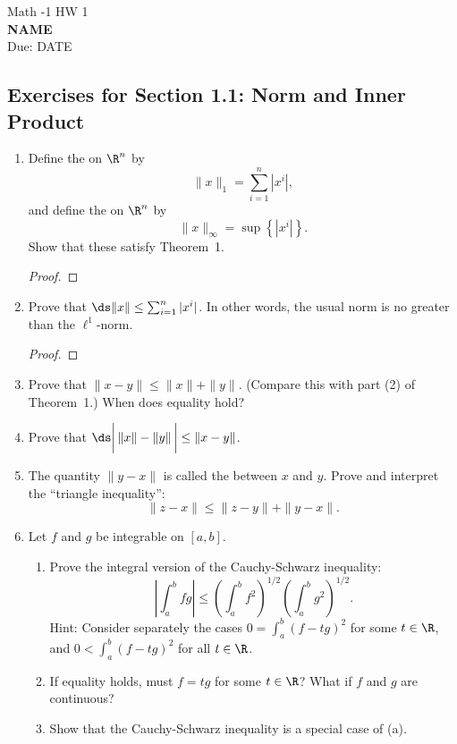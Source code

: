 \documentclass[11pt, a4paper, parskip=full]{scrartcl}
\begin{document}
\begin{center}
{\Large Math -1 \hspace{0.5cm} HW 1}\\
\textbf{NAME}\\ %
Due: DATE %
\end{center}

\vspace{0.2 cm}


\subsection*{Exercises for Section 1.1: Norm and Inner Product}

\begin{enumerate}
\item\label{norms}
Define the  on $\R^n$ by
	$$\|x\|_1 = \sum_{i=1}^n |x^i|,$$
	and define the  on $\R^n$ by
	$$\|x\|_\infty = \sup\left\{|x^i|\right\}.$$
	Show that these satisfy Theorem~1.
\begin{proof}
\end{proof}

\item	Prove that $\ds \|x\|\leq \sum_{i=1}^n |x^i|$.  In other words, the usual norm is no greater than the $\ell^1$-norm.
\begin{proof}
\end{proof}

\item	Prove that $\|x-y\| \leq \|x\| + \|y\|$.  (Compare this with part (2) of
	Theorem~1.)  When does equality hold?

\item	Prove that $\ds \bigg| \, \|x\|-\|y\| \, \bigg| \leq \|x-y\|$.

\item	The quantity $\|y-x\|$ is called the  between $x$ and
$y$.  Prove and interpret the ``triangle inequality'':
$$\|z-x\| \leq \|z-y\| + \|y-x\|.$$

\item\label{caushw}	Let $f$ and $g$ be integrable on $[a,b]$.
\begin{enumerate}
	\item	Prove the integral version of the Cauchy-Schwarz inequality:
	$$\left|\int_a^b fg\right| \leq \left(\int_a^b
	f^2\right)^{1/2}\left(\int_a^b g^2\right)^{1/2}.$$
	Hint:  Consider separately the cases $0 = \int_a^b(f-t g)^2$ for
	some $t\in\R$, and $0<\int_a^b(f-t g)^2$ for all
	$t\in\R$.
	\item	If equality holds, must $f=t g$ for some $t\in\R$?
	What if $f$ and $g$ are continuous?
	\item	Show that the Cauchy-Schwarz inequality is a special case of
	(a).


\end{enumerate}
\end{enumerate}
\end{document}
